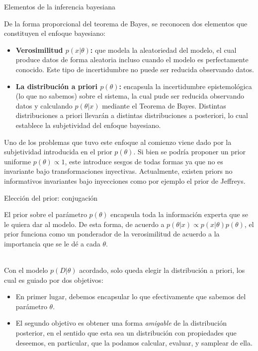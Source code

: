 \documentclass[9pt]{beamer}
\begin{document}
\begin{frame}{Elementos de la inferencia bayesiana}

De la forma proporcional del teorema de Bayes, se reconocen dos elementos que constituyen el enfoque bayesiano:

\begin{itemize}
	\item \textbf{Verosimilitud $p(x|\theta)$:} que modela la aleatoriedad del modelo, el cual produce datos de forma aleatoria incluso cuando el modelo es perfectamente conocido. Este tipo de incertidumbre no puede ser reducida observando datos.\pause
	\item \textbf{La distribución a priori $p(\theta)$:}  encapsula la incertidumbre epistemológica (lo que no sabemos) sobre el sistema, la cual pude ser reducida observando datos y calculando $p(\theta|x)$ mediante el Teorema de Bayes. Distintas distribuciones a priori llevarán a distintas distribuciones a posteriori, lo cual establece la subjetividad del enfoque bayesiano.\pause
\end{itemize}

Uno de los problemas que tuvo este enfoque al comienzo viene dado por la subjetividad introducida en el prior $p(\theta)$. Si bien se podría proponer un prior uniforme $p(\theta)\propto 1$, este introduce sesgos de todas formas ya que no es invariante bajo transformaciones inyectivas. Actualmente, existen priors no informativos invariantes bajo inyecciones como por ejemplo el prior de Jeffreys.
	
\end{frame}

\begin{frame}{Elección del prior: conjugación}

El prior sobre el parámetro $p(\theta)$ encapsula toda la información experta que se le quiera dar al modelo. De esta forma, de acuerdo a $p(\theta|x) \propto p(x|\theta)p(\theta)$, el prior funciona como un ponderador de la verosimilitud de acuerdo a la importancia que se le dé a cada $\theta$. \\~\ \pause

Con el modelo $p(D|\theta)$ acordado, solo  queda elegir la distribución a priori, los cual es guiado por dos objetivos:\pause

\begin{itemize}
	\item  En primer lugar, debemos encapsular lo que efectivamente que sabemos del parámetro $\theta$.\pause
	\item  El segundo objetivo es obtener una forma \emph{amigable} de la distribución posterior, en el sentido que esta sea un distribución con propiedades que deseemos, en particular, que la podamos calcular, evaluar, y samplear de ella.
	
\end{itemize}

\end{frame}
\end{document}
